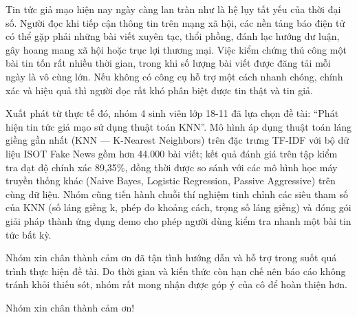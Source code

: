 
Tin tức giả mạo hiện nay ngày càng lan tràn như là hệ lụy tất yếu của thời đại số. Người đọc khi tiếp cận thông tin trên mạng xã hội, các nền tảng báo điện tử có thể gặp phải những bài viết xuyên tạc, thổi phồng, đánh lạc hướng dư luận, gây hoang mang xã hội hoặc trục lợi thương mại. Việc kiểm chứng thủ công một bài tin tốn rất nhiều thời gian, trong khi số lượng bài viết được đăng tải mỗi ngày là vô cùng lớn. Nếu không có công cụ hỗ trợ một cách nhanh chóng, chính xác và hiệu quả thì người đọc rất khó phân biệt được tin thật và tin giả.

Xuất phát từ thực tế đó, nhóm 4 sinh viên lớp 18-11 đã lựa chọn đề tài: ``Phát hiện tin tức giả mạo sử dụng thuật toán KNN''. Mô hình áp dụng thuật toán láng giềng gần nhất (KNN --- K-Nearest Neighbors) trên đặc trưng TF-IDF với bộ dữ liệu ISOT Fake News gồm hơn 44.000 bài viết; kết quả đánh giá trên tập kiểm tra đạt độ chính xác 89,35\%, đồng thời được so sánh với các mô hình học máy truyền thống khác (Naive Bayes, Logistic Regression, Passive Aggressive) trên cùng dữ liệu. Nhóm cũng tiến hành chuỗi thí nghiệm tinh chỉnh các siêu tham số của KNN (số láng giềng k, phép đo khoảng cách, trọng số láng giềng) và đóng gói giải pháp thành ứng dụng demo cho phép người dùng kiểm tra nhanh một bài tin tức bất kỳ.

Nhóm xin chân thành cảm ơn \GiangVienHD{} đã tận tình hướng dẫn và hỗ trợ trong suốt quá trình thực hiện đề tài. Do thời gian và kiến thức còn hạn chế nên báo cáo không tránh khỏi thiếu sót, nhóm rất mong nhận được góp ý của cô để hoàn thiện hơn.

\begin{flushright}
Nhóm xin chân thành cảm ơn!
\end{flushright}
